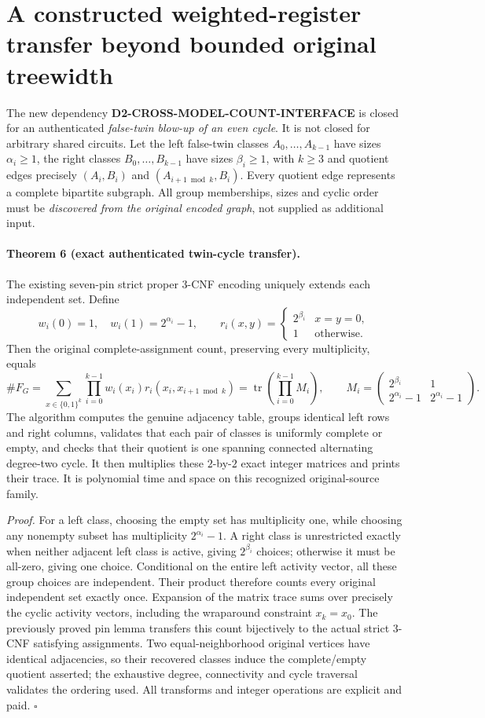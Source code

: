 \documentclass[11pt]{article}
\begin{document}
\section{A constructed weighted-register transfer beyond bounded original treewidth}
The new dependency \textbf{D2-CROSS-MODEL-COUNT-INTERFACE} is closed for an authenticated \emph{false-twin blow-up of an even cycle}. It is not closed for arbitrary shared circuits. Let the left false-twin classes $A_0,\ldots,A_{k-1}$ have sizes $\alpha_i\ge1$, the right classes $B_0,\ldots,B_{k-1}$ have sizes $\beta_i\ge1$, with $k\ge3$ and quotient edges precisely $(A_i,B_i)$ and $(A_{i+1\bmod k},B_i)$. Every quotient edge represents a complete bipartite subgraph. All group memberships, sizes and cyclic order must be \emph{discovered from the original encoded graph}, not supplied as additional input.

\paragraph{Theorem 6 (exact authenticated twin-cycle transfer).}
The existing seven-pin strict proper 3-CNF encoding uniquely extends each independent set. Define
\[
w_i(0)=1,\quad w_i(1)=2^{\alpha_i}-1,\qquad
r_i(x,y)=\begin{cases}2^{\beta_i}&x=y=0,\\1&\text{otherwise}.\end{cases}
\]
Then the original complete-assignment count, preserving every multiplicity, equals
\[
\#F_G=\sum_{x\in\{0,1\}^k}\prod_{i=0}^{k-1}w_i(x_i)r_i(x_i,x_{i+1\bmod k})
=\operatorname{tr}\left(\prod_{i=0}^{k-1}M_i\right),\qquad
M_i=\begin{pmatrix}2^{\beta_i}&1\\ 2^{\alpha_i}-1&2^{\alpha_i}-1\end{pmatrix}.
\]
The algorithm computes the genuine adjacency table, groups identical left rows and right columns, validates that each pair of classes is uniformly complete or empty, and checks that their quotient is one spanning connected alternating degree-two cycle. It then multiplies these $2$-by-$2$ exact integer matrices and prints their trace. It is polynomial time and space on this recognized original-source family.

\emph{Proof.} For a left class, choosing the empty set has multiplicity one, while choosing any nonempty subset has multiplicity $2^{\alpha_i}-1$. A right class is unrestricted exactly when neither adjacent left class is active, giving $2^{\beta_i}$ choices; otherwise it must be all-zero, giving one choice. Conditional on the entire left activity vector, all these group choices are independent. Their product therefore counts every original independent set exactly once. Expansion of the matrix trace sums over precisely the cyclic activity vectors, including the wraparound constraint $x_k=x_0$. The previously proved pin lemma transfers this count bijectively to the actual strict 3-CNF satisfying assignments. Two equal-neighborhood original vertices have identical adjacencies, so their recovered classes induce the complete/empty quotient asserted; the exhaustive degree, connectivity and cycle traversal validates the ordering used. All transforms and integer operations are explicit and paid. \hfill$\square$
\end{document}
